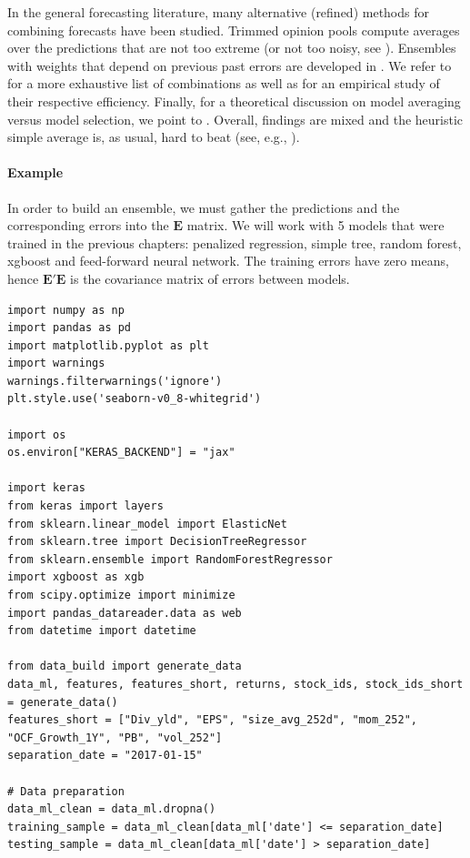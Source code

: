 In the general forecasting literature, many alternative (refined) methods for combining forecasts have been studied. Trimmed opinion pools \citep{grushka2016ensembles} compute averages over the predictions that are not too extreme (or not too noisy, see \cite{chiang2021modeling}). Ensembles with weights that depend on previous past errors are developed in \cite{pike2020combining}. We refer to \cite{gaba2017combining} for a more exhaustive list of combinations as well as for an empirical study of their respective efficiency. Finally, for a theoretical discussion on model averaging versus model selection, we point to \cite{pengimprovability}.
Overall, findings are mixed and the heuristic simple average is, as usual, hard to beat (see, e.g., \cite{genre2013combining}).

\paragraph{Example}

In order to build an ensemble, we must gather the predictions and the corresponding errors into the $\textbf{E}$ matrix. We will work with 5 models that were trained in the previous chapters: penalized regression, simple tree, random forest, xgboost and feed-forward neural network. The training errors have zero means, hence $\textbf{E}'\textbf{E}$ is the covariance matrix of errors between models.

\begin{verbatim}
import numpy as np
import pandas as pd
import matplotlib.pyplot as plt
import warnings
warnings.filterwarnings('ignore')
plt.style.use('seaborn-v0_8-whitegrid')

import os
os.environ["KERAS_BACKEND"] = "jax"

import keras
from keras import layers
from sklearn.linear_model import ElasticNet
from sklearn.tree import DecisionTreeRegressor
from sklearn.ensemble import RandomForestRegressor
import xgboost as xgb
from scipy.optimize import minimize
import pandas_datareader.data as web
from datetime import datetime

from data_build import generate_data
data_ml, features, features_short, returns, stock_ids, stock_ids_short = generate_data()
features_short = ["Div_yld", "EPS", "size_avg_252d", "mom_252", "OCF_Growth_1Y", "PB", "vol_252"]
separation_date = "2017-01-15"

# Data preparation
data_ml_clean = data_ml.dropna()
training_sample = data_ml_clean[data_ml['date'] <= separation_date]
testing_sample = data_ml_clean[data_ml['date'] > separation_date]
\end{verbatim}

